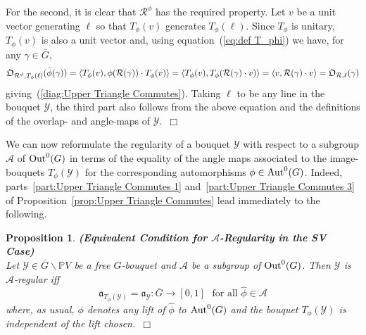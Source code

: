 \documentclass[12pt]{article}
\newtheorem{prop}{Proposition}[section]
\newcommand{\addwords}[1]{\ \ \ \mbox{#1}}
\newcommand{\Aut}{{\rm Aut}}
\newcommand{\PVmodbarG}{\ensuremath{
\bar{G}\backslash \bbP V}}
\newcommand{\bbP}{\ensuremath{\mathbb{P}}}
\newcommand{\bbR}{\ensuremath{\mathbb{R}}}
\newcommand{\cA}{\ensuremath{\mathcal{A}}}
\newcommand{\cR}{\ensuremath{\mathcal{R}}}
\newcommand{\cY}{\ensuremath{\mathcal{Y}}}
\newcommand{\ePf}{~$\Box$\vertsp\par}%
\newcommand{\fa}{\ensuremath{\mathfrak{a}}}
\newcommand{\Out}{{\rm Out}}
\newcommand{\rAng}{{\rm Ang^\bbR}}
\newcommand{\vertsp}{\vspace{1ex}}
\newcommand{\barG}{\ensuremath{\bar{G}}}
\newcommand{\cAng}{{\frak O}}
\begin{document}
For the second, it is clear that $\cR^\phi$ has the required property. Let $v$ be a unit vector generating $\ell$ so that $T_\phi(v)$ generates $T_\phi(\ell)$. Since $T_\phi$ is unitary, $T_\phi(v)$ is also a unit vector and, using equation~(\ref{eq:def T_phi}) we have, for any $\gamma\in \barG$, 
$$
\cAng_{\cR^\phi, T_\phi(\ell)}(\bar\phi(\gamma))=
\langle T_\phi(v),\phi(\cR(\gamma))\cdot T_\phi(v) \rangle=
\langle T_\phi(v), T_\phi(\cR(\gamma)\cdot v) \rangle=
\langle v, \cR(\gamma)\cdot v\rangle=\cAng_{\cR, \ell}(\gamma)
$$ 
giving~(\ref{diag:Upper Triangle Commutes}). Taking $\ell$ to be any line in the bouquet $\cY$, the third part also follows from the above equation and the definitions of the overlap- and angle-maps of $\cY$.\ePf 
\noindent We can now reformulate the regularity of a bouquet $\cY$ with respect to a subgroup $\cA$ of $\Out^0(G)$ in terms of the equality of the angle maps associated to the image-bouquets $T_\phi(\cY)$ for the corresponding automorphisms
$\phi\in\Aut^0(G)$. Indeed, parts~\ref{part:Upper Triangle Commutes 1} and~\ref{part:Upper Triangle Commutes 3} of Proposition~\ref{prop:Upper Triangle Commutes} lead immediately to the following. 
\begin{prop}\label{prop:equiv condit for regularity}{\bf (Equivalent Condition for $\cA$-Regularity in the SV Case)}\ \\
	Let $\cY\in\PVmodbarG$ be a \emph{free} $G$-bouquet and $\cA$ be a subgroup of $\Out^0(G)$. Then $\cY$ is {\em $\cA$-regular} iff 
	$$
	\fa_{T_\phi(\cY)}=\fa_{\cY}:\barG\rightarrow[0,1]
	\addwords{for all $\hat\phi\in\cA$}
	$$
	where, as usual, $\phi$ denotes any lift of $\hat\phi$ to $\Aut^0(G)$ and the bouquet $T_\phi(\cY)$ is independent of the lift chosen.\ePf  
\end{prop}
\end{document}
